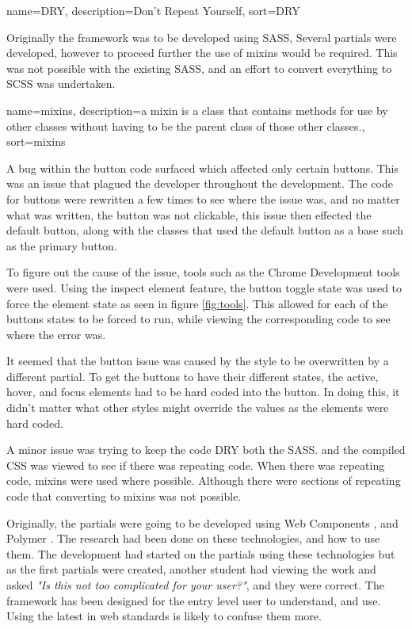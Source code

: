 {
  name={DRY},
  description={Don't Repeat Yourself},
  sort=DRY
}

Originally the framework was to be developed using \gls{SASS}, Several partials were developed, however to proceed further the use of \gls{mixins} would be required. This was not possible with the existing \gls{SASS}, and an effort to convert everything to \gls{SCSS} was undertaken.
 
{
  name={mixins},
  description={a mixin is a class that contains methods for use by other classes without having to be the parent class of those other classes.},
  sort=mixins
}

A bug within the button code surfaced which affected only certain buttons. This was an issue that plagued the developer throughout the development. The code for buttons were rewritten a few times to see where the issue was, and no matter what was written, the button was not clickable, this issue then effected the default button, along with the classes that used the default button as a base such as the primary button. 

To figure out the cause of the issue, tools such as the Chrome Development tools were used. Using the inspect element feature, the button toggle state was used to force the element state as seen in figure \ref{fig:tools}. This allowed for each of the buttons states to be forced to run, while viewing the corresponding code to see where the error was. 

It seemed that the button issue was caused by the style to be overwritten by a different partial. To get the buttons to have their different states, the active, hover, and focus elements had to be hard coded into the button. In doing this, it didn't matter what other styles might override the values as the elements were hard coded.

A minor issue was trying to keep the code \gls{DRY} both the \gls{SASS}. and the compiled \gls{CSS} was viewed to see if there was repeating code. When there was repeating code, \gls{mixins} were used where possible. Although there were sections of repeating code that converting to \gls{mixins} was not possible. 

Originally, the partials were going to be developed using Web Components \citep{Web17}, and Polymer \citep{Google17b}. The research had been done on these technologies, and how to use them. The development had started on the partials using these technologies but as the first partials were created, another student had viewing the work and asked \textit{"Is this not too complicated for your user?"}, and they were correct. The framework has been designed for the entry level user to understand, and use. Using the latest in web standards is likely to confuse them more.

